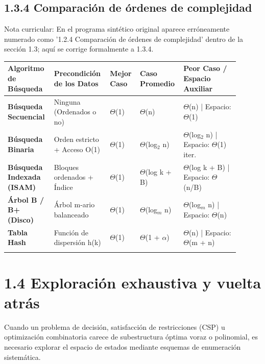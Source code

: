 \documentclass[11pt,letterpaper]{article}
\begin{document}
\subsection*{1.3.4 Comparación de órdenes de complejidad}
Nota curricular: En el programa sintético original aparece erróneamente numerado como '1.2.4 Comparación de órdenes de complejidad' dentro de la sección 1.3; aquí se corrige formalmente a 1.3.4.\par
\vspace{4pt}\noindent
\begin{tabular}{>{\raggedright\arraybackslash}p{0.194\linewidth}>{\raggedright\arraybackslash}p{0.208\linewidth}>{\raggedright\arraybackslash}p{0.111\linewidth}>{\raggedright\arraybackslash}p{0.152\linewidth}>{\raggedright\arraybackslash}p{0.235\linewidth}}
\toprule
\textbf{\color{ipnguinda}Algoritmo de Búsqueda} & \textbf{\color{ipnguinda}Precondición de los Datos} & \textbf{\color{ipnguinda}Mejor Caso} & \textbf{\color{ipnguinda}Caso Promedio} & \textbf{\color{ipnguinda}Peor Caso / Espacio Auxiliar} \\
\midrule
\textbf{Búsqueda Secuencial} & Ninguna (Ordenados o no) & $\Theta$(1) & $\Theta$(n) & $\Theta$(n) | Espacio: $\Theta$(1) \\
\addlinespace[3pt]
\textbf{Búsqueda Binaria} & Orden estricto + Acceso O(1) & $\Theta$(1) & $\Theta$(log$_2$ n) & $\Theta$(log$_2$ n) | Espacio: $\Theta$(1) iter. \\
\addlinespace[3pt]
\textbf{Búsqueda Indexada (ISAM)} & Bloques ordenados + Índice & $\Theta$(1) & $\Theta$(log k + B) & $\Theta$(log k + B) | Espacio: $\Theta$(n/B) \\
\addlinespace[3pt]
\textbf{Árbol B / B+ (Disco)} & Árbol m-ario balanceado & $\Theta$(1) & $\Theta$(log$_m$ n) & $\Theta$(log$_m$ n) | Espacio: $\Theta$(n) \\
\addlinespace[3pt]
\textbf{Tabla Hash} & Función de dispersión h(k) & $\Theta$(1) & $\Theta$(1 + $\alpha$) & $\Theta$(n) | Espacio: $\Theta$(m + n) \\
\addlinespace[3pt]
\bottomrule
\end{tabular}
\vspace{6pt}\par
\section*{1.4 Exploración exhaustiva y vuelta atrás}
Cuando un problema de decisión, satisfacción de restricciones (CSP) u optimización combinatoria carece de subestructura óptima voraz o polinomial, es necesario explorar el espacio de estados mediante esquemas de enumeración sistemática.\par
\end{document}
